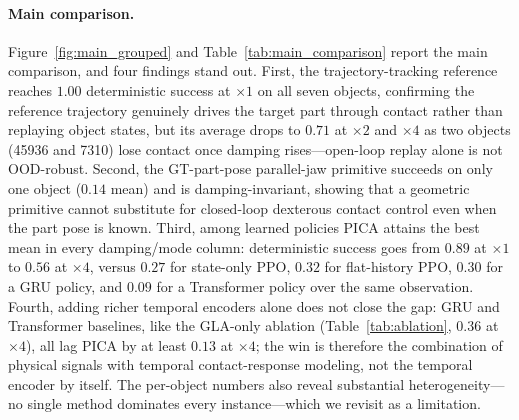 \documentclass{article}
\begin{document}
\paragraph{Main comparison.}

Figure~\ref{fig:main_grouped} and Table~\ref{tab:main_comparison} report the main comparison, and four findings stand out. First, the trajectory-tracking reference reaches $1.00$ deterministic success at $\times1$ on all seven objects, confirming the reference trajectory genuinely drives the target part through contact rather than replaying object states, but its average drops to $0.71$ at $\times2$ and $\times4$ as two objects (45936 and 7310) lose contact once damping rises---open-loop replay alone is not OOD-robust. Second, the GT-part-pose parallel-jaw primitive succeeds on only one object ($0.14$ mean) and is damping-invariant, showing that a geometric primitive cannot substitute for closed-loop dexterous contact control even when the part pose is known. Third, among learned policies PICA attains the best mean in every damping/mode column: deterministic success goes from $0.89$ at $\times1$ to $0.56$ at $\times4$, versus $0.27$ for state-only PPO, $0.32$ for flat-history PPO, $0.30$ for a GRU policy, and $0.09$ for a Transformer policy over the same observation. Fourth, adding richer temporal encoders alone does not close the gap: GRU and Transformer baselines, like the GLA-only ablation (Table~\ref{tab:ablation}, $0.36$ at $\times4$), all lag PICA by at least $0.13$ at $\times4$; the win is therefore the combination of physical signals with temporal contact-response modeling, not the temporal encoder by itself. The per-object numbers also reveal substantial heterogeneity---no single method dominates every instance---which we revisit as a limitation.
\end{document}
